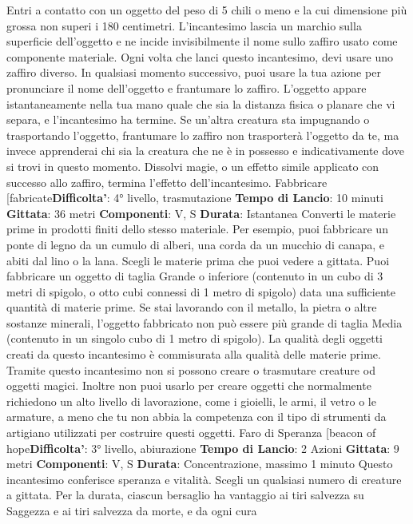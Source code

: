 \begin{multicols}{2}
Entri a contatto con un oggetto del peso di 5 chili o
meno e la cui dimensione più grossa non superi i 180
centimetri. L’incantesimo lascia un marchio sulla
superficie dell’oggetto e ne incide invisibilmente il nome
sullo zaffiro usato come componente materiale. Ogni
volta che lanci questo incantesimo, devi usare uno
zaffiro diverso.
In qualsiasi momento successivo, puoi usare la tua
azione per pronunciare il nome dell’oggetto e
frantumare lo zaffiro. L’oggetto appare istantaneamente
nella tua mano quale che sia la distanza fisica o planare
che vi separa, e l’incantesimo ha termine.
Se un’altra creatura sta impugnando o trasportando
l’oggetto, frantumare lo zaffiro non trasporterà l’oggetto
da te, ma invece apprenderai chi sia la creatura che ne
è in possesso e indicativamente dove si trovi in questo
momento.
Dissolvi magie, o un effetto simile applicato con
successo allo zaffiro, termina l’effetto dell’incantesimo.
Fabbricare
[fabricate\textbf{Difficolta'}:
4° livello, trasmutazione
\textbf{Tempo di Lancio}: 10 minuti
\textbf{Gittata}: 36 metri
\textbf{Componenti}: V, S
\textbf{Durata}: Istantanea
Converti le materie prime in prodotti finiti dello stesso
materiale. Per esempio, puoi fabbricare un ponte di
legno da un cumulo di alberi, una corda da un mucchio
di canapa, e abiti dal lino o la lana.
Scegli le materie prima che puoi vedere a gittata. Puoi
fabbricare un oggetto di taglia Grande o inferiore
(contenuto in un cubo di 3 metri di spigolo, o otto cubi
connessi di 1 metro di spigolo) data una sufficiente
quantità di materie prime. Se stai lavorando con il
metallo, la pietra o altre sostanze minerali, l’oggetto
fabbricato non può essere più grande di taglia Media
(contenuto in un singolo cubo di 1 metro di spigolo). La
qualità degli oggetti creati da questo incantesimo è
commisurata alla qualità delle materie prime.
Tramite questo incantesimo non si possono creare o
trasmutare creature od oggetti magici. Inoltre non puoi
usarlo per creare oggetti che normalmente richiedono
un alto livello di lavorazione, come i gioielli, le armi, il
vetro o le armature, a meno che tu non abbia la
competenza con il tipo di strumenti da artigiano utilizzati
per costruire questi oggetti.
Faro di Speranza
[beacon of hope\textbf{Difficolta'}:
3° livello, abiurazione
\textbf{Tempo di Lancio}: 2 Azioni
\textbf{Gittata}: 9 metri
\textbf{Componenti}: V, S
\textbf{Durata}: Concentrazione, massimo 1 minuto
Questo incantesimo conferisce speranza e vitalità.
Scegli un qualsiasi numero di creature a gittata. Per la
durata, ciascun bersaglio ha vantaggio ai tiri salvezza
su Saggezza e ai tiri salvezza da morte, e da ogni cura

\end{multicols}
